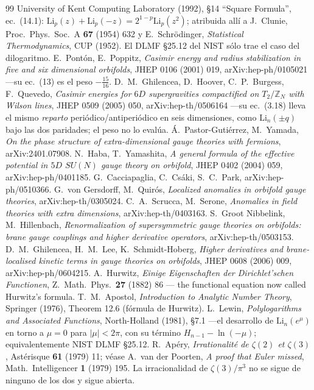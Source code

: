 \documentclass[11pt,a4paper]{article}
\newcommand{\ZZ}{\mathbb{Z}}
\begin{document}
\begin{thebibliography}{99}
University of Kent Computing Laboratory (1992), \S14 ``Square Formula'', ec.~(14.1):
$\mathrm{Li}_p(z)+\mathrm{Li}_p(-z)=2^{1-p}\mathrm{Li}_p(z^2)$; atribuida allí a J.~Clunie,
Proc.\ Phys.\ Soc.\ A \textbf{67} (1954) 632 y E.~Schr\"odinger, \emph{Statistical
Thermodynamics}, CUP (1952). El DLMF \S25.12 del NIST sólo trae el caso del dilogaritmo.
 E.~Pont\'on, E.~Poppitz, \emph{Casimir energy and radius stabilization in five and
six dimensional orbifolds}, JHEP 0106 (2001) 019, arXiv:hep-ph/0105021 ---su ec.~(13) es el peso
$-\tfrac{15}{16}$.
 D.~M.~Ghilencea, D.~Hoover, C.~P.~Burgess, F.~Quevedo, \emph{Casimir energies for
$6D$ supergravities compactified on $T_2/\ZZ_N$ with Wilson lines}, JHEP 0509 (2005) 050,
arXiv:hep-th/0506164 ---su ec.~(3.18) lleva el mismo \emph{reparto} periódico/antiperiódico en seis
dimensiones, como $\mathrm{Li}_n(\pm q)$ bajo las dos paridades; el peso no lo evalúa.
 \'A.~Pastor-Guti\'errez, M.~Yamada, \emph{On the phase structure of
extra-dimensional gauge theories with fermions}, arXiv:2401.07908.
 N.~Haba, T.~Yamashita, \emph{A general formula of the effective potential in $5D$
$SU(N)$ gauge theory on orbifold}, JHEP 0402 (2004) 059, arXiv:hep-ph/0401185.
 G.~Cacciapaglia, C.~Cs\'aki, S.~C.~Park, arXiv:hep-ph/0510366.
 G.~von Gersdorff, M.~Quir\'os, \emph{Localized anomalies in orbifold gauge
theories}, arXiv:hep-th/0305024.
 C.~A.~Scrucca, M.~Serone, \emph{Anomalies in field theories with extra dimensions},
arXiv:hep-th/0403163.
 S.~Groot Nibbelink, M.~Hillenbach, \emph{Renormalization of supersymmetric gauge
theories on orbifolds: brane gauge couplings and higher derivative operators},
arXiv:hep-th/0503153.
 D.~M.~Ghilencea, H.~M.~Lee, K.~Schmidt-Hoberg, \emph{Higher derivatives and
brane-localised kinetic terms in gauge theories on orbifolds}, JHEP 0608 (2006) 009,
arXiv:hep-ph/0604215.
 A.~Hurwitz, \emph{Einige Eigenschaften der Dirichlet'schen Functionen}, Z.\ Math.\ Phys.\ \textbf{27} (1882) 86 --- the functional equation now called Hurwitz's formula.
 T.~M.~Apostol, \emph{Introduction to Analytic Number Theory}, Springer (1976), Theorem 12.6 (fórmula de Hurwitz).
 L.~Lewin, \emph{Polylogarithms and Associated Functions}, North-Holland (1981), \S7.1 ---el desarrollo de $\mathrm{Li}_n(e^{\mu})$ en torno a $\mu=0$ para $|\mu|<2\pi$, con su término $H_{n-1}-\ln(-\mu)$; equivalentemente NIST DLMF \S25.12.
 R.~Ap\'ery, \emph{Irrationalit\'e de $\zeta(2)$ et $\zeta(3)$}, Ast\'erisque \textbf{61} (1979) 11; véase A.~van der Poorten, \emph{A proof that Euler missed}, Math.\ Intelligencer \textbf{1} (1979) 195. La irracionalidad de $\zeta(3)/\pi^3$ no se sigue de ninguno de los dos y sigue abierta.

\end{thebibliography}
\end{document}
